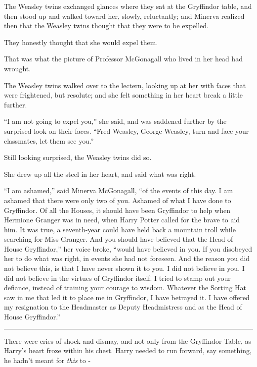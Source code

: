 The Weasley twins exchanged glances where they sat at the Gryffindor
table, and then stood up and walked toward her, slowly, reluctantly; and
Minerva realized then that the Weasley twins thought that they were to
be expelled.

They honestly thought that she would expel them.

That was what the picture of Professor McGonagall who lived in her head
had wrought.

The Weasley twins walked over to the lectern, looking up at her with
faces that were frightened, but resolute; and she felt something in her
heart break a little further.

``I am not going to expel you,'' she said, and was saddened further by
the surprised look on their faces. ``Fred Weasley, George Weasley, turn
and face your classmates, let them see you.''

Still looking surprised, the Weasley twins did so.

She drew up all the steel in her heart, and said what was right.

``I am ashamed,'' said Minerva McGonagall, ``of the events of this day.
I am ashamed that there were only two of you. Ashamed of what I have
done to Gryffindor. Of all the Houses, it should have been Gryffindor to
help when Hermione Granger was in need, when Harry Potter called for the
brave to aid him. It was true, a seventh-year could have held back a
mountain troll while searching for Miss Granger. And you should have
believed that the Head of House Gryffindor,'' her voice broke, ``would
have believed in you. If you disobeyed her to do what was right, in
events she had not foreseen. And the reason you did not believe this, is
that I have never shown it to you. I did not believe in you. I did not
believe in the virtues of Gryffindor itself. I tried to stamp out your
defiance, instead of training your courage to wisdom. Whatever the
Sorting Hat saw in me that led it to place me in Gryffindor, I have
betrayed it. I have offered my resignation to the Headmaster as Deputy
Headmistress and as the Head of House Gryffindor.''

\begin{center}\rule{3in}{0.4pt}\end{center}

There were cries of shock and dismay, and not only from the Gryffindor
Table, as Harry's heart froze within his chest. Harry needed to run
forward, say something, he hadn't meant for \emph{this} to -

